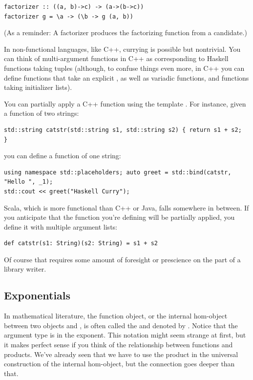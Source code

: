 \begin{verbatim}
factorizer :: ((a, b)->c) -> (a->(b->c))
factorizer g = \a -> (\b -> g (a, b))
\end{verbatim}

(As a reminder: A factorizer produces the factorizing function from a
candidate.)

In non-functional languages, like C++, currying is possible but
nontrivial. You can think of multi-argument functions in C++ as
corresponding to Haskell functions taking tuples (although, to confuse
things even more, in C++ you can define functions that take an explicit
, as well as variadic functions, and functions taking
initializer lists).

You can partially apply a C++ function using the template
. For instance, given a function of two strings:

\begin{verbatim}
std::string catstr(std::string s1, std::string s2) { return s1 + s2;
}
\end{verbatim}

you can define a function of one string:

\begin{verbatim}
using namespace std::placeholders; auto greet = std::bind(catstr, "Hello ", _1);
std::cout << greet("Haskell Curry");
\end{verbatim}

Scala, which is more functional than C++ or Java, falls somewhere in
between. If you anticipate that the function you're defining will be
partially applied, you define it with multiple argument lists:

\begin{verbatim}
def catstr(s1: String)(s2: String) = s1 + s2
\end{verbatim}

Of course that requires some amount of foresight or prescience on the
part of a library writer.

\subsection{Exponentials}\label{exponentials}

In mathematical literature, the function object, or the internal
hom-object between two objects  and , is often
called the  and denoted by . Notice that
the argument type is in the exponent. This notation might seem strange
at first, but it makes perfect sense if you think of the relationship
between functions and products. We've already seen that we have to use
the product in the universal construction of the internal hom-object,
but the connection goes deeper than that.


